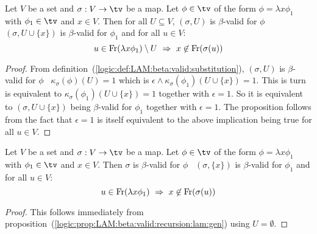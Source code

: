 \begin{prop}\label{logic:prop:LAM:beta:valid:recursion:lam:gen}
    Let $V$ be a set and $\sigma:V\to\tv$ be a map. Let $\phi\in\tv$ 
    of the form $\phi=\lambda x\phi_{1}$ with $\phi_{1}\in\tv$ and $x\in V$. 
    Then for all $U\subseteq V$, $(\sigma,U)$ is $\beta$-valid for $\phi$ 
    \ifand\ $(\sigma, U\cup\{x\})$ is $\beta$-valid for $\phi_{1}$ and for 
    all $u\in V$:
    \[
        u\in\free(\lambda x\phi_{1})\setminus U
        \ \Rightarrow\ 
        x\not\in\free(\sigma(u))
    \]
\end{prop}
\begin{proof}
    From definition~(\ref{logic:def:LAM:beta:valid:substitution}), $(\sigma,U)$
    is $\beta$-valid for $\phi$ \ifand\ $\kappa_{\sigma}(\phi)(U)=1$ which is
    $\epsilon\land\kappa_{\sigma}(\phi_{1})(U\cup\{x\})=1$. This is turn is
    equivalent to $\kappa_{\sigma}(\phi_{1})(U\cup\{x\})=1$ together with 
    $\epsilon=1$. So it is equivalent to $(\sigma,U\cup\{x\})$ being 
    $\beta$-valid for $\phi_{1}$ together with $\epsilon=1$. The proposition
    follows from the fact that $\epsilon=1$ is itself equivalent to the
    above implication being true for all $u\in V$.
\end{proof}
\begin{prop}\label{logic:prop:LAM:beta:valid:recursion:lam}
    Let $V$ be a set and $\sigma:V\to\tv$ be a map. Let $\phi\in\tv$ 
    of the form $\phi=\lambda x\phi_{1}$ with $\phi_{1}\in\tv$ and $x\in V$. 
    Then $\sigma$ is $\beta$-valid for $\phi$ 
    \ifand\ $(\sigma, \{x\})$ is $\beta$-valid for $\phi_{1}$ and for 
    all $u\in V$:
    \[
        u\in\free(\lambda x\phi_{1})
        \ \Rightarrow\ 
        x\not\in\free(\sigma(u))
    \]
\end{prop}
\begin{proof}
    This follows immediately from 
    proposition~(\ref{logic:prop:LAM:beta:valid:recursion:lam:gen}) using 
    $U=\emptyset$.
\end{proof}

